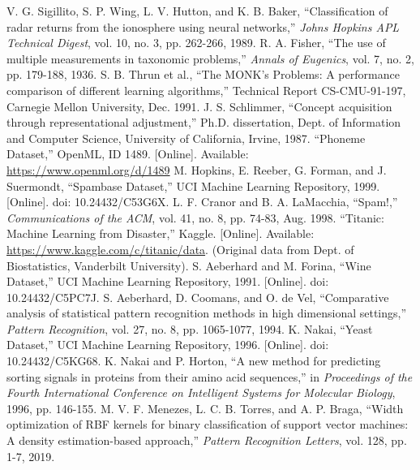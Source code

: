 \documentclass[conference]{IEEEtran}
\begin{document}
\begin{thebibliography}{99}
 V. G. Sigillito, S. P. Wing, L. V. Hutton, and K. B. Baker, “Classification of radar returns from the ionosphere using neural networks,” \textit{Johns Hopkins APL Technical Digest}, vol. 10, no. 3, pp. 262-266, 1989.
 R. A. Fisher, “The use of multiple measurements in taxonomic problems,” \textit{Annals of Eugenics}, vol. 7, no. 2, pp. 179-188, 1936.
 S. B. Thrun et al., “The MONK's Problems: A performance comparison of different learning algorithms,” Technical Report CS-CMU-91-197, Carnegie Mellon University, Dec. 1991.
 J. S. Schlimmer, “Concept acquisition through representational adjustment,” Ph.D. dissertation, Dept. of Information and Computer Science, University of California, Irvine, 1987.
 “Phoneme Dataset,” OpenML, ID 1489. [Online]. Available: \url{https://www.openml.org/d/1489}
 M. Hopkins, E. Reeber, G. Forman, and J. Suermondt, “Spambase Dataset,” UCI Machine Learning Repository, 1999. [Online]. doi: 10.24432/C53G6X.
 L. F. Cranor and B. A. LaMacchia, “Spam!,” \textit{Communications of the ACM}, vol. 41, no. 8, pp. 74-83, Aug. 1998.
 “Titanic: Machine Learning from Disaster,” Kaggle. [Online]. Available: \url{https://www.kaggle.com/c/titanic/data}. (Original data from Dept. of Biostatistics, Vanderbilt University).
 S. Aeberhard and M. Forina, “Wine Dataset,” UCI Machine Learning Repository, 1991. [Online]. doi: 10.24432/C5PC7J.
 S. Aeberhard, D. Coomans, and O. de Vel, “Comparative analysis of statistical pattern recognition methods in high dimensional settings,” \textit{Pattern Recognition}, vol. 27, no. 8, pp. 1065-1077, 1994.
 K. Nakai, “Yeast Dataset,” UCI Machine Learning Repository, 1996. [Online]. doi: 10.24432/C5KG68.
 K. Nakai and P. Horton, “A new method for predicting sorting signals in proteins from their amino acid sequences,” in \textit{Proceedings of the Fourth International Conference on Intelligent Systems for Molecular Biology}, 1996, pp. 146-155.
 M. V. F. Menezes, L. C. B. Torres, and A. P. Braga, “Width optimization of RBF kernels for binary classification of support vector machines: A density estimation-based approach,” \textit{Pattern Recognition Letters}, vol. 128, pp. 1-7, 2019.
\end{thebibliography}
\end{document}
